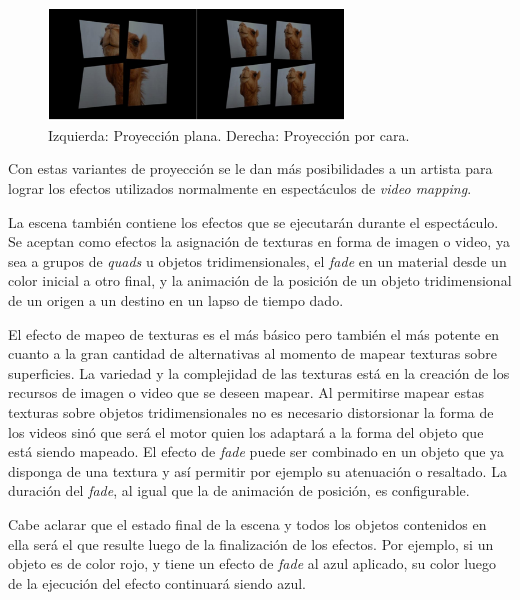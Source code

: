 \begin{figure}[H]
  \centering
    \includegraphics[width=0.7\textwidth]{./Cap5_vmt/vmtengine-maping.png}
  \caption{Izquierda: Proyección plana. Derecha: Proyección por cara.}
  \label{fig:VMT-Projection}
\end{figure}

Con estas variantes de proyección se le dan más posibilidades a un artista para lograr los efectos utilizados normalmente en espectáculos de \emph{video mapping}.

La escena también contiene los efectos que se ejecutarán durante el espectáculo. Se aceptan como efectos la asignación de texturas en forma de imagen o video, ya sea a grupos de \emph{quads} u objetos tridimensionales, el \emph{fade} en un material desde un color inicial a otro final, y la animación de la posición de un objeto tridimensional de un origen a un destino en un lapso de tiempo dado.

El efecto de mapeo de texturas es el más básico pero también el más potente en cuanto a la gran cantidad de alternativas al momento de mapear texturas sobre superficies. La variedad y la complejidad de las texturas está en la creación de los recursos de imagen o video que se deseen mapear. Al permitirse mapear estas texturas sobre objetos tridimensionales no es necesario distorsionar la forma de los videos sinó que será el motor quien los adaptará a la forma del objeto que está siendo mapeado. El efecto de \emph{fade} puede ser combinado en un objeto que ya disponga de una textura y así permitir por ejemplo su atenuación o resaltado. La duración del \emph{fade}, al igual que la de animación de posición, es configurable.

Cabe aclarar que el estado final de la escena y todos los objetos contenidos en ella será el que resulte luego de la finalización de los efectos. Por ejemplo, si un objeto es de color rojo, y tiene un efecto de \emph{fade} al azul aplicado, su color luego de la ejecución del efecto continuará siendo azul.

